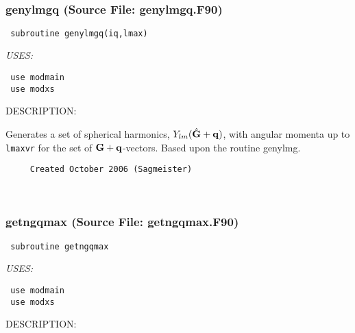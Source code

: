 \documentclass[11pt]{article}
\begin{document}
\mbox{}\hrulefill\ 
 
\subsubsection{genylmgq (Source File: genylmgq.F90)}


\begin{verbatim} subroutine genylmgq(iq,lmax)\end{verbatim}{\em USES:}
\begin{verbatim} use modmain
 use modxs\end{verbatim}
{\sf DESCRIPTION:\\ }


     Generates a set of spherical harmonics, $Y_{lm}(\hat{\bf G}+{\bf q})$,
     with angular
     momenta up to {\tt lmaxvr} for the set of ${\bf G+q}$-vectors. Based upon
     the routine genylmg.
  
\begin{verbatim}     Created October 2006 (Sagmeister)\end{verbatim}












 
 
\mbox{}\hrulefill\ 
 
\subsubsection{getngqmax (Source File: getngqmax.F90)}


\begin{verbatim} subroutine getngqmax\end{verbatim}{\em USES:}
\begin{verbatim} use modmain
 use modxs\end{verbatim}
{\sf DESCRIPTION:\\ }
\end{document}
